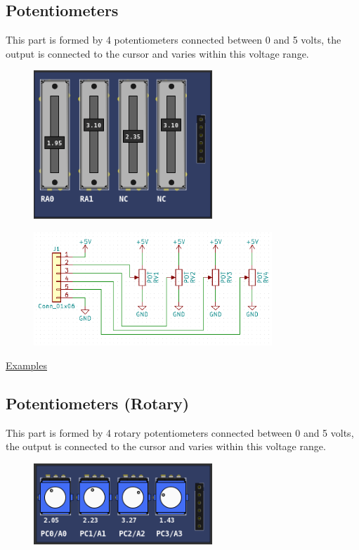 \subsection{Potentiometers}

This part is formed by 4 potentiometers connected between 0 and 5 volts, the output is connected to the cursor and varies within this voltage range.
\begin{figure}[H]
\center
\includegraphics[width=0.6\textwidth]{img/part_pot.png} 
\end{figure} 

\begin{figure}[H]
\center
\includegraphics[width=0.8\textwidth]{img/part_pot_.png} 
\end{figure} 

\href{https://lcgamboa.github.io/picsimlab_examples/examples/examples_index.html\#Potentiometers}{Examples}

\subsection{Potentiometers (Rotary)}

This part is formed by 4 rotary potentiometers connected between 0 and 5 volts, the output is connected to the cursor and varies within this voltage range.
\begin{figure}[H]
\center
\includegraphics[width=0.6\textwidth]{img/part_pot_r.png} 
\end{figure} 

